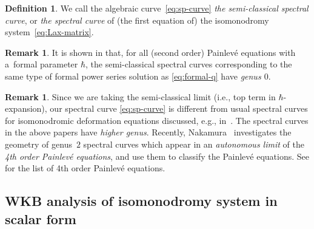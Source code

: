 \documentclass[11pt]{article}
\theoremstyle{definition}
\newtheorem{Def}[thm]{Definition}
\newtheorem{rem}[thm]{Remark}
\numberwithin{equation}{section}
\begin{document}
\begin{Def}
We call the algebraic curve~\eqref{eq:sp-curve}
{\em the semi-classical spectral curve}, or
{\em the spectral curve}
of (the f\/irst equation of) the isomonodromy system~\eqref{eq:Lax-matrix}.
\end{Def}

\begin{rem}
It is shown in \cite[Proposition~1.3]{KT-PI} that, for all (second order)
Painlev\'e equations with a~formal parameter $\hbar$,
the semi-classical spectral curves corresponding to
the same type of formal power series solution
as \eqref{eq:formal-q} have {\em genus $0$}.
\end{rem}

\begin{rem}
Since we are taking the semi-classical limit
(i.e., top term in $\hbar$-expansion),
our spectral curve \eqref{eq:sp-curve} is dif\/ferent from
usual spectral curves for isomonodromic deformation equations
discussed, e.g., in~\cite{Olsha, Takasaki}.
The spectral curves in the above papers have {\em higher genus}.
Recently, Nakamura~\cite{Nakamura} investigates
the geometry of genus~$2$ spectral curves which appear
in an {\em autonomous limit} of the
{\em 4th order Painlev\'e equations},
and use them to classify the Painlev\'e equations.
See \cite{KNS} for the list of 4th order Painlev\'e equations.
\end{rem}

\subsection{WKB analysis of isomonodromy system in scalar form}
\label{subsection:WKB-for-scalar-Lax}
\end{document}
